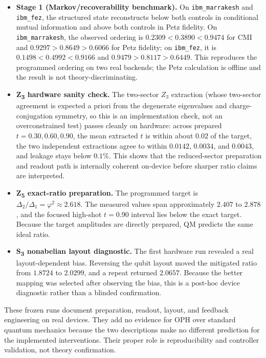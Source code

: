 \begin{itemize}
\tightlist
\item
  \textbf{Stage 1 (Markov/recoverability benchmark).} On \texttt{ibm\_marrakesh} and \texttt{ibm\_fez}, the structured state reconstructs below both controls in conditional mutual information and above both controls in Petz fidelity. On \texttt{ibm\_marrakesh}, the observed ordering is \(0.2309 < 0.3890 < 0.9474\) for CMI and \(0.9297 > 0.8649 > 0.6066\) for Petz fidelity; on \texttt{ibm\_fez}, it is \(0.1498 < 0.4992 < 0.9166\) and \(0.9479 > 0.8117 > 0.6449\). This reproduces the programmed ordering on two real backends; the Petz calculation is offline and the result is not theory-discriminating.
\item
  \textbf{Z\textsubscript{3} hardware sanity check.} The two-sector \(Z_3\) extraction (whose two-sector agreement is expected a priori from the degenerate eigenvalues and charge-conjugation symmetry, so this is an implementation check, not an overconstrained test) passes cleanly on hardware: across prepared \(t = 0.30, 0.60, 0.90\), the mean extracted \(t\) is within about \(0.02\) of the target, the two independent extractions agree to within \(0.0142\), \(0.0034\), and \(0.0043\), and leakage stays below \(0.1\%\). This shows that the reduced-sector preparation and readout path is internally coherent on-device before sharper ratio claims are interpreted.
\item
  \textbf{Z\textsubscript{5} exact-ratio preparation.} The programmed target is \(\Delta_2/\Delta_1 = \varphi^2 \approx 2.618\). The measured values span approximately \(2.407\) to \(2.878\), and the focused high-shot \(t = 0.90\) interval lies below the exact target. Because the target amplitudes are directly prepared, QM predicts the same ideal ratio.
\item
  \textbf{S\textsubscript{3} nonabelian layout diagnostic.} The first hardware run revealed a real layout-dependent bias. Reversing the qubit layout moved the mitigated ratio from \(1.8724\) to \(2.0299\), and a repeat returned \(2.0657\). Because the better mapping was selected after observing the bias, this is a post-hoc device diagnostic rather than a blinded confirmation.
\end{itemize}

These frozen runs document preparation, readout, layout, and feedback engineering on real devices. They add no evidence for OPH over standard quantum mechanics because the two descriptions make no different prediction for the implemented interventions. Their proper role is reproducibility and controller validation, not theory confirmation.


